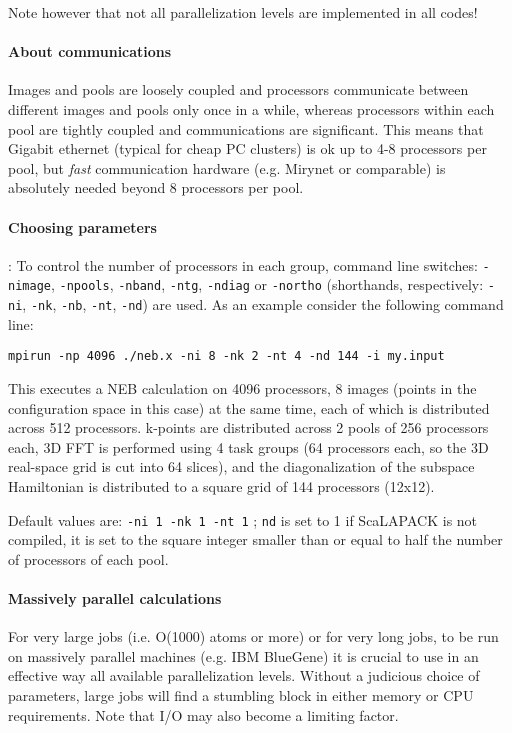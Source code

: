 \documentclass[12pt,a4paper]{article}
\begin{document}
Note however that not all parallelization levels 
are implemented in all codes! 

\paragraph{About communications}
Images and pools are loosely coupled and processors communicate
between different images and pools only once in a while, whereas
processors within each pool are tightly coupled and communications
are significant. This means that Gigabit ethernet (typical for
cheap PC clusters) is ok up to 4-8 processors per pool, but {\em fast}
communication hardware (e.g. Mirynet or comparable) is absolutely 
needed beyond 8 processors per pool.

\paragraph{Choosing parameters}:
To control the number of processors in each group,
command line switches: 
\texttt{-nimage}, \texttt{-npools}, \texttt{-nband},
\texttt{-ntg}, \texttt{-ndiag} or \texttt{-northo}
(shorthands, respectively: \texttt{-ni}, \texttt{-nk}, \texttt{-nb},
\texttt{-nt}, \texttt{-nd})
are used.
As an example consider the following command line:
\begin{verbatim}
mpirun -np 4096 ./neb.x -ni 8 -nk 2 -nt 4 -nd 144 -i my.input
\end{verbatim}
This executes a NEB calculation on 4096 processors, 8 images (points in the configuration
space in this case) at the same time, each of 
which is distributed across 512 processors.
k-points are distributed across 2 pools of 256 processors each, 
3D FFT is performed using 4 task groups (64 processors each, so
the 3D real-space grid is cut into 64 slices), and the diagonalization
of the subspace Hamiltonian is distributed to a square grid of 144
processors (12x12).

Default values are: \texttt{-ni 1 -nk 1 -nt 1} ; 
\texttt{nd} is set to 1 if ScaLAPACK is not compiled,
it is set to the square integer smaller than or equal to  half the number 
of processors of each pool.

\paragraph{Massively parallel calculations}
For very large jobs (i.e. O(1000) atoms or more) or for very long jobs,
to be run on massively parallel  machines (e.g. IBM BlueGene) it is
crucial to use in an effective way all available parallelization levels.
Without a judicious choice of parameters, large jobs will find a 
stumbling block in either memory or CPU requirements. Note that I/O
may also become a limiting factor.
\end{document}
